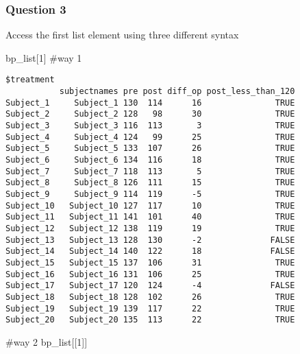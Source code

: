 \documentclass[
  letterpaper,
  DIV=11,
  numbers=noendperiod]{scrartcl}
\newenvironment{Shaded}{\begin{snugshade}}{\end{snugshade}}
\newcommand{\CommentTok}[1]{\textcolor[rgb]{0.37,0.37,0.37}{#1}}
\newcommand{\DecValTok}[1]{\textcolor[rgb]{0.68,0.00,0.00}{#1}}
\newcommand{\NormalTok}[1]{\textcolor[rgb]{0.00,0.23,0.31}{#1}}
\begin{document}
\subsubsection{Question 3}\label{question-3-2}

Access the first list element using three different syntax

\begin{Shaded}
\begin{Highlighting}[]
\NormalTok{bp\_list[}\DecValTok{1}\NormalTok{] }\CommentTok{\#way 1}
\end{Highlighting}
\end{Shaded}

\begin{verbatim}
$treatment
           subjectnames pre post diff_op post_less_than_120
Subject_1     Subject_1 130  114      16               TRUE
Subject_2     Subject_2 128   98      30               TRUE
Subject_3     Subject_3 116  113       3               TRUE
Subject_4     Subject_4 124   99      25               TRUE
Subject_5     Subject_5 133  107      26               TRUE
Subject_6     Subject_6 134  116      18               TRUE
Subject_7     Subject_7 118  113       5               TRUE
Subject_8     Subject_8 126  111      15               TRUE
Subject_9     Subject_9 114  119      -5               TRUE
Subject_10   Subject_10 127  117      10               TRUE
Subject_11   Subject_11 141  101      40               TRUE
Subject_12   Subject_12 138  119      19               TRUE
Subject_13   Subject_13 128  130      -2              FALSE
Subject_14   Subject_14 140  122      18              FALSE
Subject_15   Subject_15 137  106      31               TRUE
Subject_16   Subject_16 131  106      25               TRUE
Subject_17   Subject_17 120  124      -4              FALSE
Subject_18   Subject_18 128  102      26               TRUE
Subject_19   Subject_19 139  117      22               TRUE
Subject_20   Subject_20 135  113      22               TRUE
\end{verbatim}

\begin{Shaded}
\begin{Highlighting}[]
\CommentTok{\#way 2}
\NormalTok{bp\_list[[}\DecValTok{1}\NormalTok{]]}
\end{Highlighting}
\end{Shaded}
\end{document}
